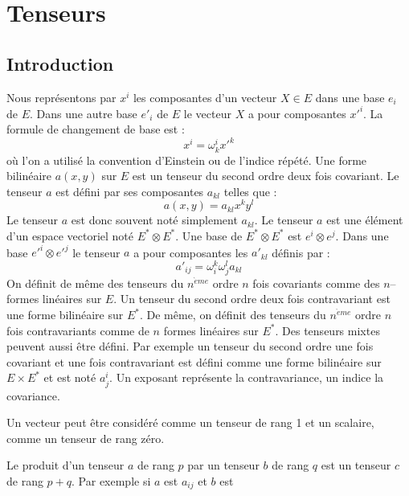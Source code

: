 \documentclass[12pt]{book}
\begin{document}
\chapter{Tenseurs}\label{chaptens}
\section{Introduction}
Nous repr\'esentons par $x^i$ les composantes d'un vecteur $X\in E$
dans une 
base $e_i$ de $E$. Dans une autre base $e'_i$ de $E$ le vecteur $X$ a
pour composantes $x'^i$. La formule de changement de base est :
\begin{equation}
x^i=\omega^i_kx'^k
\end{equation}
o\`u l'on a utilis\'e la convention d'Einstein ou de l'indice r\'ep\'et\'e.
Une forme bilin\'eaire $a(x,y)$ sur $E$ est un tenseur du second ordre
deux fois covariant.  Le tenseur $a$ est d\'efini
par ses composantes $a_{kl}$ telles que : 
\begin{equation}
a(x,y)=a_{kl}x^ky^l
\end{equation}
Le tenseur $a$ est donc souvent not\'e simplement $a_{kl}$. Le tenseur $a$ est
une 
\'el\'ement d'un espace vectoriel not\'e $E^*\otimes E^*$. Une base de
$E^*\otimes E^*$ est $e^i\otimes e^j$.
Dans une base $e'^i\otimes e'^j$
le tenseur $a$ a pour composantes les $a'_{kl}$ d\'efinis par :
\begin{equation}
a'_{ij}=\omega^k_i\omega^l_j a_{kl}
\end{equation}
On d\'efinit de m\^eme des tenseurs du $n^{\grave eme}$ ordre $n$ fois
covariants comme des $n$--formes lin\'eaires sur $E$.
Un tenseur du second ordre deux fois contravariant est une forme
bilin\'eaire sur $E^*$. De m\^eme, on d\'efinit des tenseurs du
$n^{\grave eme}$ ordre $n$ fois contravariants comme de $n$ 
formes lin\'eaires sur $E^*$. Des tenseurs mixtes peuvent aussi \^etre
d\'efini. Par exemple un tenseur du second ordre une fois covariant
et une fois contravariant est d\'efini comme une forme bilin\'eaire
sur $E\times E^*$ et est not\'e $a^i_j$.
Un exposant repr\'esente la contravariance, un indice la covariance. 
\begin{rem}
Un vecteur peut \^etre consid\'er\'e comme un tenseur de rang 1 et un
scalaire, comme un tenseur de rang z\'ero.
\end{rem}
Le produit d'un tenseur $a$ de rang $p$ par un tenseur $b$ de rang $q$
est un 
tenseur $c$ de rang $p+q$. Par exemple si $a$ est $a_{ij}$ et $b$ est
\end{document}
